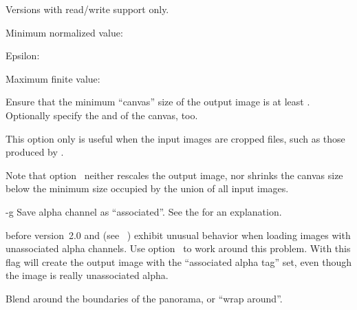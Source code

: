 \begin{codelist}
\begin{restrictedmaterial}{Versions with  read\slash write support only.}
    \begin{compactitemize}
    \item
      Minimum normalized value: 
    \item
      Epsilon: 
    \item
      Maximum finite value: 
    \end{compactitemize}
  \end{restrictedmaterial}

  \label{opt:f}%
\item[-f \metavar{WIDTH}x\metavar{HEIGHT}%
  \optional{+x\metavar{XOFFSET}+y\metavar{YOFFSET}}]\itemend
  Ensure that the minimum ``canvas'' size of the output image is at least
  \classictimes{}.  Optionally specify the  and
   of the canvas, too.

  This option only is useful when the input images are cropped  files, such as
  those produced by .

  Note that option~ neither rescales the output image, nor shrinks the canvas size
  below the minimum size occupied by the union of all input images.


  \label{opt:g}%
\item[-g]
  Save alpha channel as ``associated''. See the
   for an explanation.

   before version~2.0 and  (see
  \appendixName~) exhibit unusual behavior when loading images
  with unassociated alpha channels.  Use option~ to work around this problem.  With
  this flag \App{} will create the output image with the ``associated alpha tag'' set, even
  though the image is really unassociated alpha.


  \label{opt:wrap}%
\item[\itempar{-w \optional{\metavar{MODE}} \\ --wrap\optional{=\metavar{MODE}}}]\itemend
  Blend around the boundaries of the panorama, or ``wrap around''.


\end{codelist}
